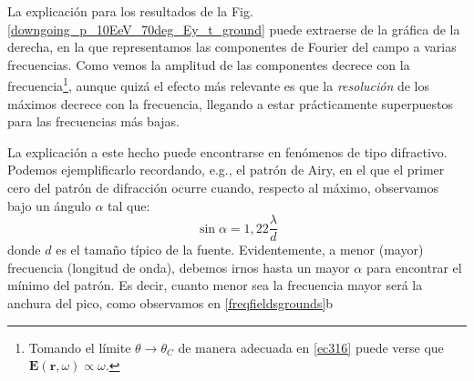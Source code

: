 \documentclass[12 pt, a4paper]{article} %
\numberwithin{equation}{section}
\numberwithin{figure}{section}
\numberwithin{table}{section}
\newcommand{\vect}[1]{\boldsymbol{\mathbf{#1}}}
\begin{document}


 La explicación para los resultados de la Fig. \ref{downgoing_p_10EeV_70deg_Ey_t_ground} puede extraerse de la gráfica de la derecha, en la que representamos las componentes de Fourier del campo a varias frecuencias. Como vemos la amplitud de las componentes decrece con la frecuencia\footnote{ Tomando el límite $\theta\rightarrow\theta_C$ de manera adecuada en \eqref{ec316} puede verse que $\vect{E}\left(\vect{r},\omega\right)\propto\omega$.}, aunque quizá el efecto más relevante es que la \textit{resolución} de los máximos decrece con la frecuencia, llegando a estar prácticamente superpuestos para las frecuencias más bajas. 

La explicación a este hecho puede encontrarse en fenómenos de tipo difractivo. Podemos ejemplificarlo recordando, e.g., el patrón de Airy, en el que el primer cero del patrón de difracción ocurre cuando, respecto al máximo, observamos bajo un ángulo $\alpha$ tal que:
\begin{equation}
	\sin\alpha=1,22\frac{\lambda}{d}\label{ec318}
\end{equation}  
donde $d$ es el tamaño típico de la fuente. Evidentemente, a menor (mayor) frecuencia (longitud de onda), debemos irnos hasta un mayor $\alpha$ para encontrar el mínimo del patrón. Es decir, cuanto menor sea la frecuencia mayor será la anchura del pico, como observamos en \ref{freqfieldsgrounds}b
\end{document}
